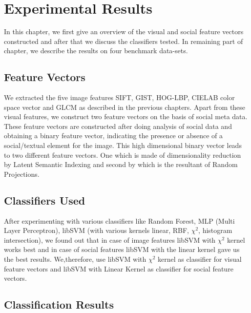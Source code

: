 
\chapter{Experimental Results} %


In this chapter, we first give an overview of the visual and social feature vectors constructed and after that we discuss the classifiers tested. In remaining part of chapter, we describe the results on four benchmark data-sets.

\section{Feature Vectors}
We extracted the five image features SIFT, GIST, HOG-LBP, CIELAB color space vector and
GLCM as described in the previous chapters. Apart from these visual features, we construct two feature vectors on the basis of social meta data. These feature vectors are constructed after doing analysis of social data and obtaining a binary feature vector, indicating the presence or absence of a social/textual element for the image.
     This high dimensional binary vector leads to two different feature vectors. One which is made of dimensionality reduction by Latent Semantic Indexing and second by which is the resultant of Random Projections.



\section{Classifiers Used}

After experimenting with various classifiers like Random Forest, MLP (Multi Layer Perceptron), libSVM (with various kernels linear, RBF, $\chi^2$, histogram intersection), we found out that in case of image features libSVM with $\chi^2$ kernel works best and in case of social features libSVM with the linear kernel gave us the best results. We,therefore, use libSVM with $\chi^2$ kernel as classifier for visual feature vectors and libSVM with Linear Kernel as classifier for social feature vectors.


\section{Classification Results}

